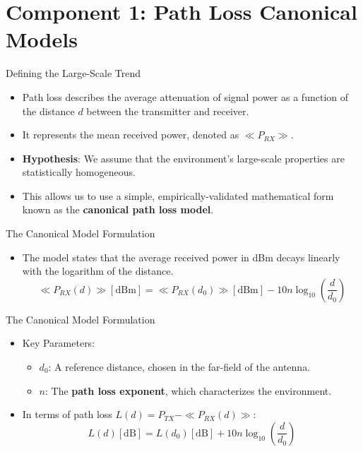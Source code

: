 \documentclass{beamer}
\begin{document}
	\section{Component 1: Path Loss Canonical Models}
	
	\begin{frame}{Defining the Large-Scale Trend}
		\begin{itemize}
			\item Path loss describes the average attenuation of signal power as a function of the distance $d$ between the transmitter and receiver.
			\item It represents the mean received power, denoted as $\ll P_{RX} \gg$.
			\item \textbf{Hypothesis}: We assume that the environment's large-scale properties are statistically homogeneous.
			\item This allows us to use a simple, empirically-validated mathematical form known as the \textbf{canonical path loss model}.
		\end{itemize}
	\end{frame}
	
	\begin{frame}{The Canonical Model Formulation}
		\begin{itemize}
			\item The model states that the average received power in dBm decays linearly with the logarithm of the distance.
			\[ \ll P_{RX}(d)\gg[\text{dBm}] = \ll P_{RX}(d_{0})\gg[\text{dBm}] - 10n \log_{10}\left(\frac{d}{d_0}\right) \]
		\end{itemize}
	\end{frame}
	
	\begin{frame}{The Canonical Model Formulation}
		\begin{itemize}
			\item Key Parameters:
			\begin{itemize}
				\item $d_0$: A reference distance, chosen in the far-field of the antenna.
				\item $n$: The \textbf{path loss exponent}, which characterizes the environment.
			\end{itemize}
			\item In terms of path loss $L(d) = P_{TX} - \ll P_{RX}(d) \gg$:
			\[ L(d)[\text{dB}] = L(d_0)[\text{dB}] + 10n \log_{10}\left(\frac{d}{d_0}\right) \]
		\end{itemize}
	\end{frame}
	
\end{document}
